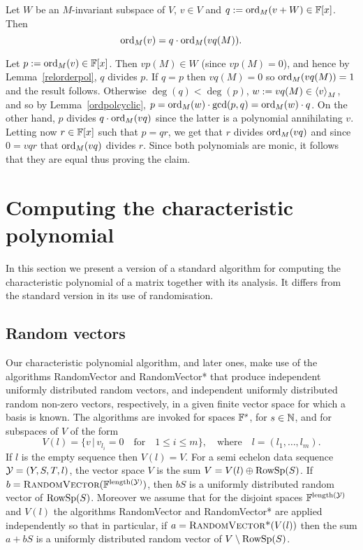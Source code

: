 \begin{Lemm}
\label{absordpoly}
Let $W$ be an $M$-invariant subspace of $V$, $v \in V$ and 
$q := \mathrm{ord}_M(v+W) \in \mathbb{F}[x]$. Then
\[ \mathrm{ord}_M(v) = q \cdot \mathrm{ord}_M(vq(M)). \]
\end{Lemm}
\proofbeg
Let $p := \mathrm{ord}_M(v) \in \mathbb{F}[x]$. Then $vp(M) \in W$ (since $vp(M)=0$),
and hence by Lemma~\ref{relorderpol}, $q$ divides $p$. If $q=p$
then $vq(M)=0$ so $\mathrm{ord}_M(vq(M)) =1$ and the result follows.
Otherwise $\deg(q)< \deg(p)$, $w:=vq(M)\in\left< v\right>_M$, and so by
Lemma~\ref{ordpolcyclic}, $p=\mathrm{ord}_M(w)\cdot \gcd(p,q)=\mathrm{ord}_M(w)\cdot q$.
 On the
 other hand, $p$ divides $q \cdot \mathrm{ord}_M(vq)$ since the latter is a
 polynomial annihilating $v$. Letting now $r \in \mathbb{F}[x]$ such that $p=qr$,
 we get that $r$ divides $\mathrm{ord}_M(vq)$ and since $0 = vqr$
 that $\mathrm{ord}_M(vq)$ divides $r$. Since both polynomials are monic, it
 follows that they are equal thus proving the claim.
\proofend

\section{Computing the characteristic polynomial}

\label{charpoly}

In this section we present a version of a standard algorithm for computing
the characteristic polynomial of a matrix together with its analysis. 
It differs from the standard version in its use of randomisation. 

\subsection{Random vectors}\label{random}
%
%
Our characteristic polynomial algorithm, and later ones, 
make use of the algorithms {\sc Ran\-dom\-Vec\-tor} and 
{\sc RandomVector*} that produce independent uniformly 
dis\-tri\-bu\-ted random vectors, and independent uniformly distributed
random non-zero vectors,             
respectively, in a given finite vector space for which a basis is known.    
The algorithms are invoked for spaces
$\mathbb{F}^s$, for $s \in \mathbb{N}$, and for subspaces of $V$ of the form
\[
V(l)=\{ v\,|\, v_{l_i}=0\quad\mbox{for}\quad  1\leq i\leq m\},
\quad\mbox{where}\quad l=(l_1,\dots,l_m).
\]
If $l$ is the empty sequence then $V(l)=V$.
For a semi echelon data sequence $\mathcal{Y} = (Y,S,T,l)$, the 
vector space $V$ is the sum $V=V(l) \oplus \mathrm{RowSp}(S)$. 
If $b=\mbox{\sc RandomVector}(\mathbb{F}^{\mathrm{length}(\mathcal{Y})})$, then $bS$ is a
uniformly distributed random vector of $\mathrm{RowSp}(S)$. 
Moreover we assume that for the disjoint spaces 
$\mathbb{F}^{\mathrm{length}(\mathcal{Y})}$ and $V(l)$ the 
algorithms {\sc RandomVector} and {\sc RandomVector*} are applied 
independently so that in particular, 
if $a=\mbox{\sc RandomVector*}(V(l))$ 
then the sum 
$a + bS$ is a uniformly distributed random vector of $V\setminus \mathrm{RowSp}(S)$. 

